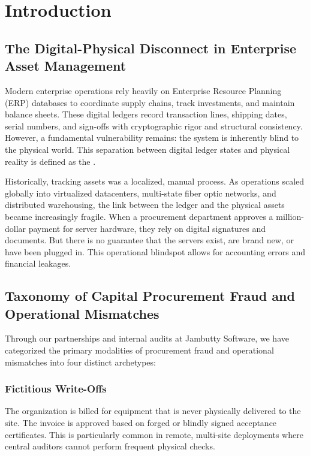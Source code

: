\documentclass[11pt,letterpaper]{report}
\begin{document}
\newpage
{}

\chapter{Introduction}

\section{The Digital-Physical Disconnect in Enterprise Asset Management}

Modern enterprise operations rely heavily on Enterprise Resource Planning (ERP) databases to coordinate supply chains, track investments, and maintain balance sheets. These digital ledgers record transaction lines, shipping dates, serial numbers, and sign-offs with cryptographic rigor and structural consistency. However, a fundamental vulnerability remains: the system is inherently blind to the physical world. This separation between digital ledger states and physical reality is defined as the .

Historically, tracking assets was a localized, manual process. As operations scaled globally into virtualized datacenters, multi-state fiber optic networks, and distributed warehousing, the link between the ledger and the physical assets became increasingly fragile. When a procurement department approves a million-dollar payment for server hardware, they rely on digital signatures and documents. But there is no guarantee that the servers exist, are brand new, or have been plugged in. This operational blindspot allows for accounting errors and financial leakages. 

\section{Taxonomy of Capital Procurement Fraud and Operational Mismatches}

Through our partnerships and internal audits at Jambutty Software, we have categorized the primary modalities of procurement fraud and operational mismatches into four distinct archetypes:

\subsection{Fictitious Write-Offs}
The organization is billed for equipment that is never physically delivered to the site. The invoice is approved based on forged or blindly signed acceptance certificates. This is particularly common in remote, multi-site deployments where central auditors cannot perform frequent physical checks.
\end{document}
